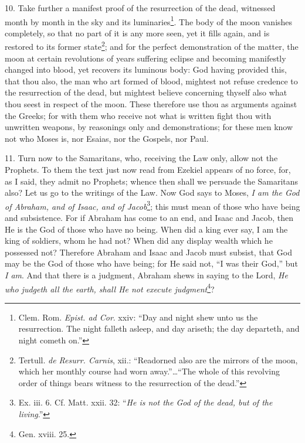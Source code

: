 10. Take further a manifest proof of the resurrection of the dead, witnessed month by month in the sky and its luminaries\footnote{Clem. Rom. \emph{Epist. ad Cor}. xxiv: “Day and night shew unto us the resurrection. The night falleth asleep, and day ariseth; the day departeth, and night cometh on.”}. The body of the moon vanishes completely, so that no part of it is any more seen, yet it fills again, and is restored to its former state\footnote{Tertull. \emph{de Resurr. Carnis}, xii.: “Readorned also are the mirrors of the moon, which her monthly course had worn away.”…“The whole of this revolving order of things bears witness to the resurrection of the dead.”}; and for the perfect demonstration of the matter, the moon at certain revolutions of years suffering eclipse and becoming manifestly changed into blood, yet recovers its luminous body: God having provided this, that thou also, the man who art formed of blood, mightest not refuse credence to the resurrection of the dead, but mightest believe concerning thyself also what thou seest in respect of the moon. These therefore use thou as arguments against the Greeks; for with them who receive not what is written fight thou with unwritten weapons, by reasonings only and demonstrations; for these men know not who Moses is, nor Esaias, nor the Gospels, nor Paul.

11. Turn now to the Samaritans, who, receiving the Law only, allow not the Prophets. To them the text just now read from Ezekiel appears of no force, for, as I said, they admit no Prophets; whence then shall we persuade the Samaritans also? Let us go to the writings of the Law. Now God says to Moses, \emph{I am the God of Abraham, and of Isaac, and of Jacob}\footnote{Ex. iii. 6. Cf. Matt. xxii. 32: “\emph{He is not the God of the dead, but of the living}.”}; this must mean of those who have being and subsistence. For if Abraham has come to an end, and Isaac and Jacob, then He is the God of those who have no being. When did a king ever say, I am the king of soldiers, whom he had not? When did any display wealth which he possessed not? Therefore Abraham and Isaac and Jacob must subsist, that God may be the God of those who have being; for He said not, “I was their God,” but \emph{I am}. And that there is a judgment, Abraham shews in saying to the Lord, \emph{He who judgeth all the earth, shall He not execute judgment}\footnote{Gen. xviii. 25.}?

